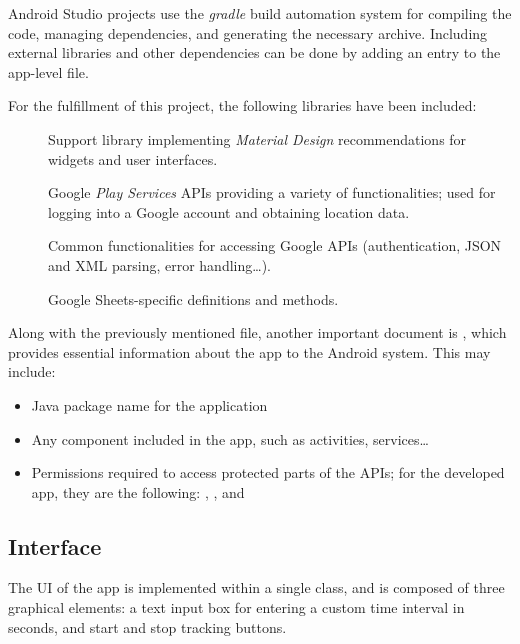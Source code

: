 Android Studio projects use the \emph{gradle} build automation system for compiling the code, managing dependencies, and generating the necessary  archive.
Including external libraries and other dependencies can be done by adding an entry to the app-level  file.

For the fulfillment of this project, the following libraries have been included:
\begin{description}
	\item[{\footnotesize{}}] Support library implementing \emph{Material Design} recommendations for widgets and user interfaces.
	\item[{\footnotesize{}}] Google \emph{Play Services} APIs providing a variety of functionalities; used for logging into a Google account and obtaining location data.
	\item[{\footnotesize{}}] Common functionalities for accessing Google APIs (authentication, JSON and XML parsing, error handling\dots).
	\item[{\footnotesize{}}] Google Sheets-specific definitions and methods.
\end{description}

Along with the previously mentioned  file, another important document is , which provides essential information about the app to the Android system.
This may include:
\begin{itemize}
	\item Java package name for the application
	\item Any component included in the app, such as activities, services\dots
	\item Permissions required to access protected parts of the APIs; for the developed app, they are the following: , ,  and 
\end{itemize}


\subsection{Interface}
The UI of the app is implemented within a single  class, and is composed of three graphical elements: a text input box for entering a custom time interval in seconds, and start and stop tracking buttons.

